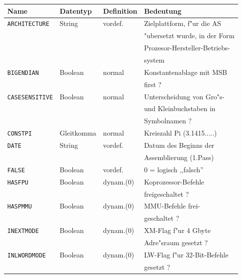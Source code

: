 \documentclass[12pt,a4paper,twoside]{report}
\newcommand{\tty}[1]{{\tt #1}}
\newcommand{\asname}{AS}
\begin{document}
\begin{center}\begin{longtable}{|l|l|l|l|}
\hline
Name             &  Datentyp   & Definition & Bedeutung \\
\hline\hline
\endhead
\tty{ARCHITECTURE} & String    & vordef.    & Zielplattform, f"ur die \asname{} \\
                 &             &            & "ubersetzt wurde, in der Form \\
                 &             &            & Prozesor-Hersteller-Betriebs- \\
                 &             &            & system \\
\hline
\tty{BIGENDIAN}  &  Boolean    & normal     & Konstantenablage mit MSB \\
                 &             &            & first ? \\
\hline
\tty{CASESENSITIVE} & Boolean  & normal     & Unterscheidung von Gro"s- \\
                 &             &            & und Kleinbuchstaben in \\
                 &             &            & Symbolnamen ? \\
\hline
\tty{CONSTPI}    &  Gleitkomma & normal     & Kreiszahl Pi (3.1415.....) \\
\hline
\tty{DATE}       &  String     & vordef.    & Datum des Beginns der  \\
                 &             &            & Assemblierung (1.Pass) \\
\hline
\tty{FALSE}      &  Boolean    & vordef.    & 0 = logisch ,,falsch'' \\
\hline
\tty{HASFPU}     &  Boolean    & dynam.(0)  & Koprozessor-Befehle \\
                 &             &            & freigeschaltet ? \\
\hline
\tty{HASPMMU}    &  Boolean    & dynam.(0)  & MMU-Befehle frei- \\
                 &             &            & geschaltet ? \\
\hline
\tty{INEXTMODE}  &  Boolean    & dynam.(0)  & XM-Flag f"ur 4 Gbyte \\
                 &             &            & Adre"sraum gesetzt ? \\
\hline
\tty{INLWORDMODE} & Boolean    & dynam.(0)  & LW-Flag f"ur 32-Bit-Befehle \\
                 &             &            & gesetzt ? \\

\end{longtable}
\end{center}
\end{document}
